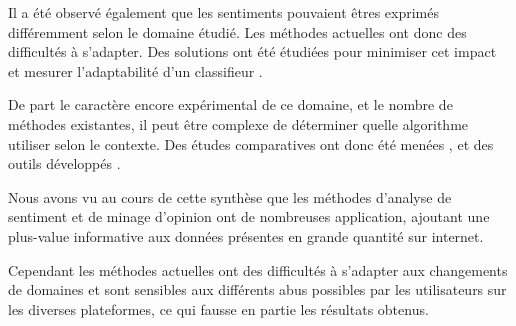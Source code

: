 \documentclass[8pt]{article}
\begin{document}
\par Il a été observé également que les sentiments pouvaient êtres exprimés différemment selon le domaine étudié. Les méthodes actuelles ont donc des difficultés à s’adapter. Des solutions ont été étudiées pour minimiser cet impact et mesurer l’adaptabilité d’un classifieur \cite{ressource15}.
\par De part le caractère encore expérimental de ce domaine, et le nombre de méthodes existantes, il peut être complexe de déterminer quelle algorithme utiliser selon le contexte. Des études comparatives ont donc été menées \cite{ressource29} \cite{ressource26}, et des outils développés \cite{ressource29} \cite{ressource19}.


\par Nous avons vu au cours de cette synthèse que les méthodes d’analyse de sentiment et de minage d’opinion ont de nombreuses application, ajoutant une plus-value informative aux données présentes en grande quantité sur internet.
\par Cependant les méthodes actuelles ont des difficultés à s’adapter aux changements de domaines et sont sensibles aux différents abus possibles par les utilisateurs sur les diverses plateformes, ce qui fausse en partie les résultats obtenus.


  \newpage

  
  
\end{document}
